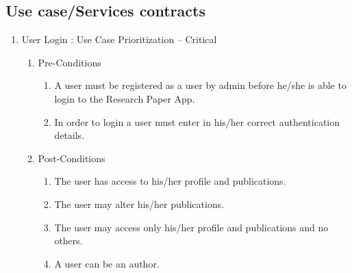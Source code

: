\documentclass[10pt,a4paper]{exam}
\begin{document}
\subsection{ Use case/Services contracts}

\begin{enumerate}
\item  User Login : Use Case Prioritization -- Critical

\begin{enumerate}
\item  Pre-Conditions

\begin{enumerate}
\item  A user must be registered as a user by admin before he/she is able to login to the Research Paper App.

\item  In order to login a user must enter in his/her correct authentication details.
\end{enumerate}

\item  Post-Conditions

\begin{enumerate}
\item  The user has access to his/her profile and publications.

\item  The user may alter his/her publications.

\item  The user may access only his/her profile and publications and no others.

\item  A user can be an author.
\end{enumerate}
\end{enumerate}
\end{enumerate}

\noindent 
\end{document}

